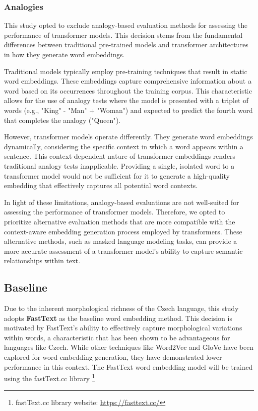 \subsubsection{Analogies}

This study opted to exclude analogy-based evaluation methods for assessing the performance of transformer models.
This decision stems from the fundamental differences between traditional pre-trained models and transformer architectures in how they generate word embeddings.

Traditional models typically employ pre-training techniques that result in static word embeddings.
These embeddings capture comprehensive information about a word based on its occurrences throughout the training corpus.
This characteristic allows for the use of analogy tests where the model is presented with a triplet of words (e.g., "King" - "Man" + "Woman") and expected to predict the fourth word that completes the analogy ("Queen").

However, transformer models operate differently.
They generate word embeddings dynamically, considering the specific context in which a word appears within a sentence.
This context-dependent nature of transformer embeddings renders traditional analogy tests inapplicable.
Providing a single, isolated word to a transformer model would not be sufficient for it to generate a high-quality embedding that effectively captures all potential word contexts.

In light of these limitations, analogy-based evaluations are not well-suited for assessing the performance of transformer models.
Therefore, we opted to prioritize alternative evaluation methods that are more compatible with the context-aware embedding generation process employed by transformers.
These alternative methods, such as masked language modeling tasks, can provide a more accurate assessment of a transformer model's ability to capture semantic relationships within text.

\subsection{Baseline}
Due to the inherent morphological richness of the Czech language, this study adopts \textbf{FastText} as the baseline word embedding method.
This decision is motivated by FastText's ability to effectively capture morphological variations within words, a characteristic that has been shown to be advantageous for languages like Czech.
While other techniques like Word2Vec and \ac{GloVe} have been explored for word embedding generation, they have demonstrated lower performance in this context.
The FastText word embedding model will be trained using the fastText.cc library \footnote{fastText.cc library website: \url{https://fasttext.cc/}}

